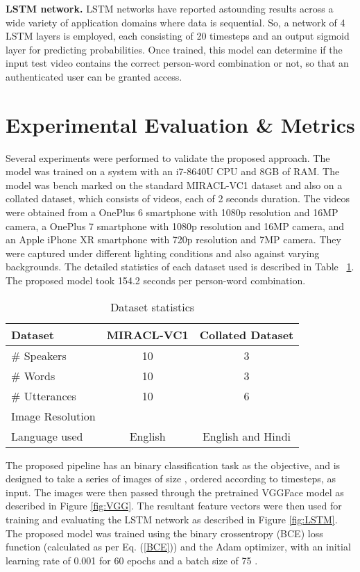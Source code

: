 \documentclass[letterpaper]{article}
\begin{document}
\vspace{1em}
\noindent\textbf{LSTM network. } LSTM networks have reported astounding results across a wide variety of application domains where data is sequential. So, a network of 4 LSTM layers is employed, each consisting of 20 timesteps and an output sigmoid layer for predicting probabilities. Once trained, this model can determine if the input test video contains the correct person-word combination or not, so that an authenticated user can be granted access. 

\vspace{1em}
\section{Experimental Evaluation \& Metrics}
Several experiments were performed to validate the proposed approach. The model was trained on a system with an i7-8640U CPU and 8GB of RAM. The model was bench marked on the standard MIRACL-VC1 dataset and also on a collated dataset, which consists of videos, each of 2 seconds duration. The videos were obtained from a OnePlus 6 smartphone with 1080p resolution and 16MP camera, a OnePlus 7 smartphone with 1080p resolution and 16MP camera, and an Apple iPhone XR smartphone with 720p resolution and 7MP camera. They were captured under different lighting conditions and also against varying backgrounds. The detailed statistics of each dataset used is described in Table ~\ref{datasets}.
 The proposed model took 154.2 seconds per person-word combination.
\begin{table}[h!]
\caption{Dataset statistics}
\centering
\begin{tabular}{l c c}
\hline
\textbf{Dataset}          & \textbf{MIRACL-VC1} & \textbf{Collated Dataset} \\ \hline
\# Speakers       & 10        & 3                \\ {\# Words}          & 10        & 3                \\ {\# Utterances}     & 10        & 6                \\ {Image Resolution }       &           & \\
{Language used}    &English &English and Hindi \\ 
\hline
\end{tabular}
\label{datasets}
\end{table}

The proposed pipeline has an binary classification task as the objective, and is designed to take a series of images of size , ordered according to timesteps, as input. The images were then passed through the pretrained VGGFace model as described in Figure \ref{fig:VGG}. The resultant feature vectors were then used for training and evaluating the LSTM network as described in Figure \ref{fig:LSTM}. The proposed model was trained using the binary crossentropy (BCE) loss function (calculated as per Eq. (\ref{BCE})) and the Adam optimizer, with an initial learning rate of 0.001 for 60 epochs and a batch size of 75 .
\end{document}
